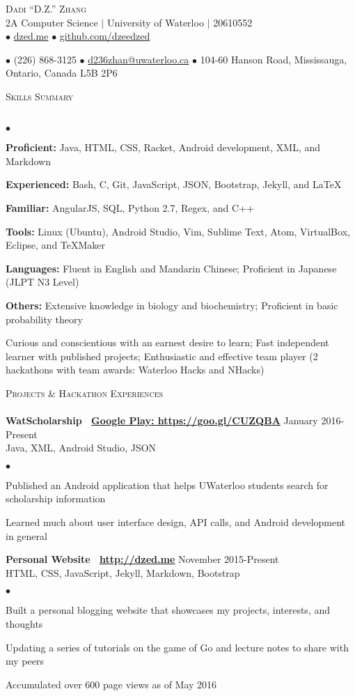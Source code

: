 \documentclass{article}
\newcommand{\lineunder}{\vspace*{-8pt} \\ \hspace*{-18pt} \hrulefill \\}
\newcommand{\header}[1]{{\hspace*{-15pt}\vspace*{6pt} \textsc{#1}} \vspace*{-6pt} \lineunder}
\newcommand{\employer}[3]{{ \textbf{#1} \hfill #2\\ {#3}\\  }}
\newcommand{\contact}[3]{
\begin{center}
{}
\end{center}
\vspace*{-8pt}
\begin{center}
{\LARGE \scshape {#1}}\\
#2\\
#3
\end{center}
\vspace*{-8pt}
}
\newenvironment{achievements}{\begin{list}{$\bullet$}{\topsep 0pt \itemsep -2pt}}{\vspace*{4pt}\end{list}}
\begin{document}
\small
\smallskip
\vspace*{-88pt}

\contact{Dadi ``D.Z.'' Zhang}
{2A Computer Science $\vert$ University of Waterloo $\vert$ 20610552}
{$\bullet$ \href{http://dzed.me}{dzed.me}
$\bullet$ \href{http://github.com/dzeedzed}{github.com/dzeedzed}}
{$\bullet$ (226) 868-3125
$\bullet$ \href{mailto:d236zhan@uwaterloo.ca}{d236zhan@uwaterloo.ca}
$\bullet$ 104-60 Hanson Road, Mississauga, Ontario, Canada L5B 2P6}

\hfill \break
\header{Skills Summary}
\begin{achievements}
\item \textbf{Proficient:} Java, HTML, CSS, Racket, Android development, XML, and Markdown
\item \textbf{Experienced:} Bash, C, Git, JavaScript, JSON, Bootstrap, Jekyll, and  \LaTeX\
\item \textbf{Familiar:} AngularJS, SQL, Python 2.7, Regex, and C++
\item \textbf{Tools:} Linux (Ubuntu), Android Studio, Vim, Sublime Text, Atom, VirtualBox, Eclipse, and TeXMaker
\item \textbf{Languages:} Fluent in English and Mandarin Chinese; Proficient in Japanese (JLPT N3 Level)
\item \textbf{Others:} Extensive knowledge in biology and biochemistry; Proficient in basic probability theory
\item Curious and conscientious with an earnest desire to learn; Fast independent learner with published projects; Enthusiastic and effective team player (2 hackathons with team awards: Waterloo Hacks and NHacks)
\end{achievements}

\header{Projects \& Hackathon Experiences}

\employer{WatScholarship \hspace{5pt} \Mundus~\href{https://goo.gl/CUZQBA}{Google Play: \underline{https://goo.gl/CUZQBA}}}{January 2016-Present}{Java, XML, Android Studio, JSON}
	\begin{achievements}
	\item Published an Android application that helps UWaterloo students search for scholarship information
	\item Learned much about user interface design, API calls, and Android development in general
	\end{achievements}
	
\employer{Personal Website \hspace{5pt} \Mundus~\href{http://dzed.me}{\underline{http://dzed.me}}}{November 2015-Present}{HTML, CSS, JavaScript, Jekyll, Markdown, Bootstrap}
	\begin{achievements}
	\item Built a personal blogging website that showcases my projects, interests, and thoughts
	\item Updating a series of tutorials on the game of Go and lecture notes to share with my peers
	\item Accumulated over 600 page views as of May 2016
	\end{achievements}
	
\end{document}
